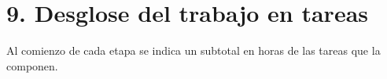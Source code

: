 \documentclass[
11pt, %
]{charter}
\begin{document}
%
%
%

\section{9. Desglose del trabajo en tareas}
\label{sec:wbs}

Al comienzo de cada etapa se indica un subtotal en horas de las tareas que la componen.
\end{document}
